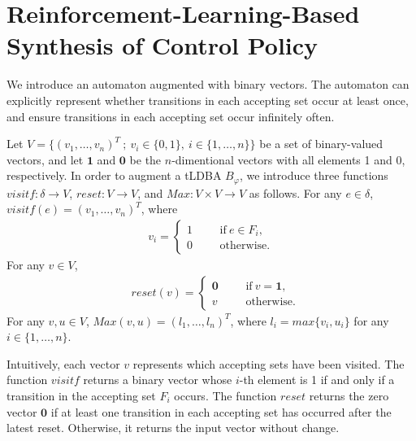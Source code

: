 \documentclass[a4j,12pt,oneside,openany,english,dvipdfmx]{jsbook}
\begin{document}
\section{Reinforcement-Learning-Based Synthesis of Control Policy}
We introduce an automaton augmented with binary vectors. The automaton can explicitly represent whether transitions in each accepting set occur at least once, and ensure transitions in each accepting set occur infinitely often.

Let $V = \{ (v_1, \ldots ,v_n)^T\ ;\ v_i \in \{ 0,1 \},\ i \in \{ 1, \ldots ,n \} \}$ be a set of binary-valued vectors, and let $\bm{1}$ and $\bm{0}$ be the $n$-dimentional vectors with all elements 1 and 0, respectively.
In order to augment a tLDBA $B_{\varphi}$, we introduce three functions $visitf:\delta \rightarrow V$, $reset:V \rightarrow V$, and $Max:V\times V \rightarrow V$ as follows.
For any $e \in \delta$, $visitf(e) = (v_1, \ldots ,v_n)^T$, where %
\begin{align}
 v_i =
  \left\{
  \begin{aligned}
    1 &   & &\text{if}\ e\in F_i, \\
    0 &   & &\text{otherwise}.
  \end{aligned}
  \right. \nonumber
\end{align}
For any $v \in V$, %
\begin{align}
  &reset(v) =
  \left\{
  \begin{aligned}
    \bm{0} &   & &\text{if}\  v = \bm{1},\\
    v &   & &\text{otherwise}.
  \end{aligned}
  \right. \nonumber
\end{align}
For any $v,u \in V$, $Max(v,u) = (l_1,\ldots ,l_n)^T$, where $l_i = max\{v_i, u_i\} $ for any $i\in \{1, \ldots ,n\}$.

Intuitively, each vector $v$ represents which accepting sets have been visited. The function $visitf$ returns a binary vector whose $i$-th element is 1 if and only if a transition in the accepting set $F_i$ occurs. The function $reset$ returns the zero vector $\bm{0}$ if at least one transition in each accepting set has occurred after the latest reset. Otherwise, it returns the input vector without change.
\end{document}
